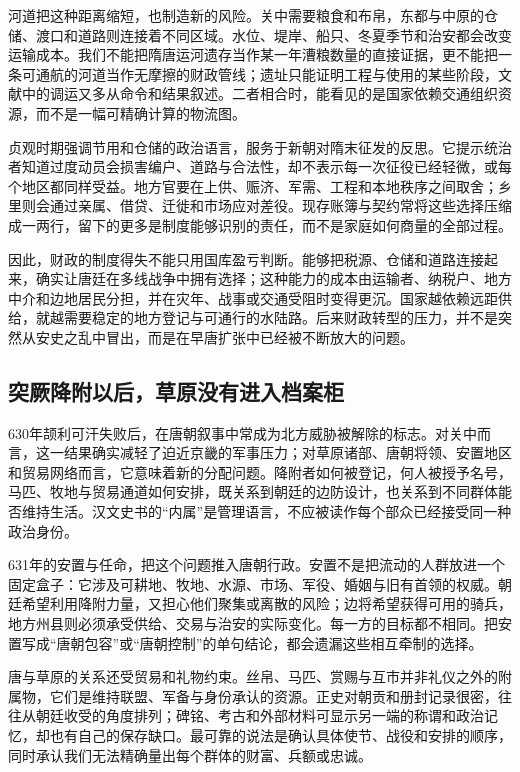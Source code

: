河道把这种距离缩短，也制造新的风险。关中需要粮食和布帛，东都与中原的仓储、渡口和道路则连接着不同区域。水位、堤岸、船只、冬夏季节和治安都会改变运输成本。我们不能把隋唐运河遗存当作某一年漕粮数量的直接证据，更不能把一条可通航的河道当作无摩擦的财政管线；遗址只能证明工程与使用的某些阶段，文献中的调运又多从命令和结果叙述。二者相合时，能看见的是国家依赖交通组织资源，而不是一幅可精确计算的物流图。

贞观时期强调节用和仓储的政治语言，服务于新朝对隋末征发的反思。它提示统治者知道过度动员会损害编户、道路与合法性，却不表示每一次征役已经轻微，或每个地区都同样受益。地方官要在上供、赈济、军需、工程和本地秩序之间取舍；乡里则会通过亲属、借贷、迁徙和市场应对差役。现存账簿与契约常将这些选择压缩成一两行，留下的更多是制度能够识别的责任，而不是家庭如何商量的全部过程。

因此，财政的制度得失不能只用国库盈亏判断。能够把税源、仓储和道路连接起来，确实让唐廷在多线战争中拥有选择；这种能力的成本由运输者、纳税户、地方中介和边地居民分担，并在灾年、战事或交通受阻时变得更沉。国家越依赖远距供给，就越需要稳定的地方登记与可通行的水陆路。后来财政转型的压力，并不是突然从安史之乱中冒出，而是在早唐扩张中已经被不断放大的问题。

\subsection{突厥降附以后，草原没有进入档案柜}
630年颉利可汗失败后，在唐朝叙事中常成为北方威胁被解除的标志。对关中而言，这一结果确实减轻了迫近京畿的军事压力；对草原诸部、唐朝将领、安置地区和贸易网络而言，它意味着新的分配问题。降附者如何被登记，何人被授予名号，马匹、牧地与贸易通道如何安排，既关系到朝廷的边防设计，也关系到不同群体能否维持生活。汉文史书的“内属”是管理语言，不应被读作每个部众已经接受同一种政治身份。

631年的安置与任命，把这个问题推入唐朝行政。安置不是把流动的人群放进一个固定盒子：它涉及可耕地、牧地、水源、市场、军役、婚姻与旧有首领的权威。朝廷希望利用降附力量，又担心他们聚集或离散的风险；边将希望获得可用的骑兵，地方州县则必须承受供给、交易与治安的实际变化。每一方的目标都不相同。把安置写成“唐朝包容”或“唐朝控制”的单句结论，都会遗漏这些相互牵制的选择。

唐与草原的关系还受贸易和礼物约束。丝帛、马匹、赏赐与互市并非礼仪之外的附属物，它们是维持联盟、军备与身份承认的资源。正史对朝贡和册封记录很密，往往从朝廷收受的角度排列；碑铭、考古和外部材料可显示另一端的称谓和政治记忆，却也有自己的保存缺口。最可靠的说法是确认具体使节、战役和安排的顺序，同时承认我们无法精确量出每个群体的财富、兵额或忠诚。

